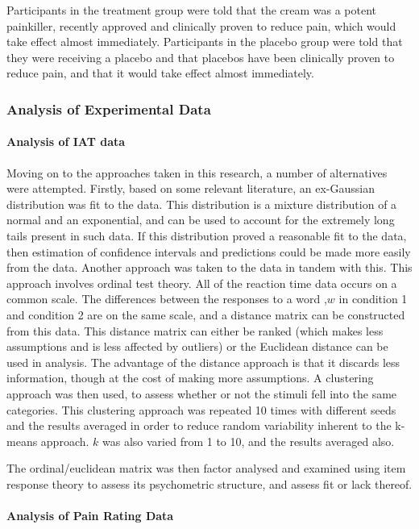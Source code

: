 Participants in the treatment group were told that the cream was a potent painkiller, recently approved and clinically proven to reduce pain, which would take effect almost immediately. Participants in the placebo group were told that they were receiving a placebo and that placebos have been clinically proven to reduce pain, and that it would take effect almost immediately. 

\subsubsection{Analysis of Experimental Data}

\paragraph{Analysis of IAT data}
Moving on to the approaches taken in this research, a number of alternatives were attempted.
Firstly, based on some relevant literature, an ex-Gaussian distribution was fit to the data. This distribution is a mixture distribution of a normal and an exponential, and can be used to account for the extremely long tails present in such data. If this distribution proved a reasonable fit to the data, then estimation of confidence intervals and predictions could be made more easily from the data. 
Another approach was taken to the data in tandem with this. This approach involves ordinal test theory. All of the reaction time data occurs on a common scale. The differences between the responses to a word ,$w$ in condition 1 and condition 2 are on the same scale, and a distance matrix can be constructed from this data. This distance matrix can either be ranked (which makes less assumptions and is less affected by outliers) or the Euclidean distance can be used in analysis. The advantage of the distance approach is that it discards less information, though at the cost of making more assumptions. A clustering approach was then used, to assess whether or not the stimuli fell into the same categories. This clustering approach was repeated 10 times with different seeds and the results averaged in order to reduce random variability inherent to the k-means approach. $k$ was also varied from 1 to 10, and the results averaged also. 

The ordinal/euclidean matrix was then factor analysed and examined using item response theory to assess its psychometric structure, and assess fit or lack thereof.

\paragraph{Analysis of Pain Rating Data}
\label{sec:analysis-pain-rating}

